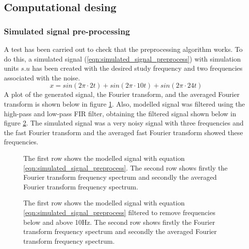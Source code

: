 \documentclass[12pt, a4paper]{article} %
\begin{document}
	\subsection{Computational desing}
	
	\subsubsection{Simulated signal pre-processing}
	
	A test has been carried out to check that the preprocessing algorithm works. To do this, a simulated signal (\ref{eqn:simulated_signal_preprocess}) with simulation units $s.u$ has been created with the desired study frequency and two frequencies associated with the noise. 
	\setlength{\parskip}{4mm}
	\begin{equation} \label{eqn:simulated_signal_preprocess}
		x = sin(2\pi\cdot 2t) + sin(2\pi\cdot 10t) + sin(2\pi\cdot 24t)
	\end{equation}
	A plot of the generated signal, the Fourier transform, and the averaged Fourier transform is shown below in figure \ref{fig:noisy_data_simulated}. Also, modelled signal was filtered using the high-pass and low-pass FIR filter, obtaining the filtered signal shown below in figure \ref{fig:noisy_filtered_data_simulated}. The simulated signal was a very noisy signal with three frequencies and the fast Fourier transform and the averaged fast Fourier transform showed these frequencies. 
	
	\begin{figure}[htbp]
		\centering
		
		\caption{The first row shows the modelled signal with equation \ref{eqn:simulated_signal_preprocess}. The second row shows firstly the Fourier transform frequency spectrum and secondly the averaged Fourier transform frequency spectrum.}
		\label{fig:noisy_data_simulated}
	\end{figure}
	
	
	\begin{figure}[htbp]
		\centering
		
		\caption{The first row shows the modelled signal with equation \ref{eqn:simulated_signal_preprocess} filtered to remove frequencies below and above 10Hz. The second row shows firstly the Fourier transform frequency spectrum and secondly the averaged Fourier transform frequency spectrum.}
		\label{fig:noisy_filtered_data_simulated}
	\end{figure}
	
\end{document}
